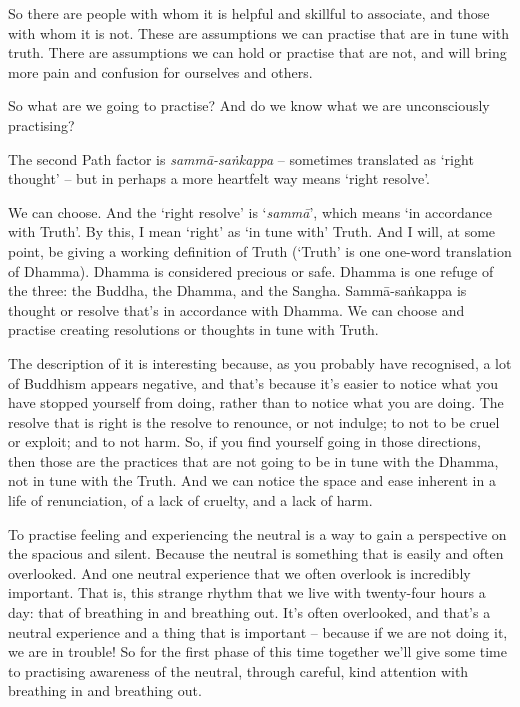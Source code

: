 So there are people with whom it is helpful and skillful to associate, and those
with whom it is not. These are assumptions we can practise that are in tune with
truth. There are assumptions we can hold or practise that are not, and will
bring more pain and confusion for ourselves and others.

So what are we going to practise? And do we know what we are unconsciously
practising?

The second Path factor is \emph{sammā-saṅkappa} -- sometimes translated as `right
thought' -- but in perhaps a more heartfelt way means `right resolve'.

We can choose. And the `right resolve' is `\emph{sammā}', which means `in
accordance with Truth'. By this, I mean `right' as `in tune with' Truth. And I
will, at some point, be giving a working definition of Truth (`Truth' is one
one-word translation of Dhamma). Dhamma is considered precious or
safe. Dhamma is one refuge of the three: the Buddha, the Dhamma,
and the Sangha. Sammā-saṅkappa is thought or resolve that's in accordance with
Dhamma. We can choose and practise creating resolutions or thoughts in tune with Truth.

The description of it is interesting because, as you probably have recognised, a
lot of Buddhism appears negative, and that's because it's easier to notice what
you have stopped yourself from doing, rather than to notice what you are doing. The
resolve that is right is the resolve to renounce, or not indulge; to not to be
cruel or exploit; and to not harm. So, if you find yourself going in those
directions, then those are the practices that are not going to be in tune with
the Dhamma, not in tune with the Truth. And we can notice the space and ease
inherent in a life of renunciation, of a lack of cruelty, and a lack of harm.

To practise feeling and experiencing the neutral is a way to gain a perspective on the spacious and silent. Because the neutral is
something that is easily and often overlooked. And one neutral experience that
we often overlook is incredibly important. That is, this strange rhythm that we
live with twenty-four hours a day: that of breathing in and breathing out. It's
often overlooked, and that's a neutral experience and a thing that is important --
because if we are not doing it, we are in trouble! So for the first phase of
this time together we'll give some time to practising awareness of the neutral,
through careful, kind attention with breathing in and breathing out.

